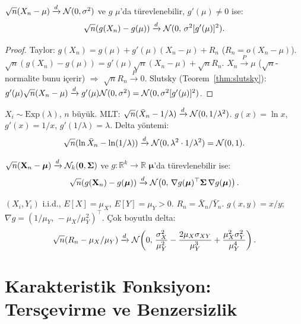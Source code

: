\begin{teorem}
\label{thm:delta_yontemi}
$\sqrt{n}(X_n - \mu) \xrightarrow{d} \mathcal{N}(0, \sigma^2)$ ve $g$ $\mu$'da türevlenebilir,
$g'(\mu) \neq 0$ ise:
\[
  \sqrt{n}(g(X_n) - g(\mu)) \xrightarrow{d} \mathcal{N}(0,\, \sigma^2 [g'(\mu)]^2).
\]
\end{teorem}

\begin{proof}
Taylor: $g(X_n) = g(\mu) + g'(\mu)(X_n-\mu) + R_n$ ($R_n = o(X_n-\mu)$).
$\sqrt{n}(g(X_n)-g(\mu)) = g'(\mu)\sqrt{n}(X_n-\mu) + \sqrt{n}R_n$.
$X_n \xrightarrow{P} \mu$ ($\sqrt{n}$-normalite bunu içerir) $\Rightarrow$ $\sqrt{n}R_n \xrightarrow{P} 0$.
Slutsky (Teorem~\ref{thm:slutsky}): $g'(\mu)\sqrt{n}(X_n-\mu) \xrightarrow{d} g'(\mu)\mathcal{N}(0,\sigma^2)
= \mathcal{N}(0, \sigma^2[g'(\mu)]^2)$.
\end{proof}

\begin{ornek}
$X_i \sim \mathrm{Exp}(\lambda)$, $n$ büyük. MLT: $\sqrt{n}(\bar{X}_n - 1/\lambda) \xrightarrow{d} \mathcal{N}(0, 1/\lambda^2)$.
$g(x) = \ln x$, $g'(x) = 1/x$, $g'(1/\lambda) = \lambda$.
Delta yöntemi:
\[
  \sqrt{n}(\ln\bar{X}_n - \ln(1/\lambda)) \xrightarrow{d} \mathcal{N}(0, \lambda^2 \cdot 1/\lambda^2) = \mathcal{N}(0,1).
\]
\end{ornek}

\begin{teorem}
\label{thm:delta_cok}
$\sqrt{n}(\mathbf{X}_n - \boldsymbol{\mu}) \xrightarrow{d} \mathcal{N}_k(\mathbf{0}, \boldsymbol{\Sigma})$
ve $g : \mathbb{R}^k \to \mathbb{R}$ $\boldsymbol{\mu}$'da türevlenebilir ise:
\[
  \sqrt{n}(g(\mathbf{X}_n) - g(\boldsymbol{\mu})) \xrightarrow{d}
  \mathcal{N}\!\left(0,\, \nabla g(\boldsymbol{\mu})^\top \boldsymbol{\Sigma}\, \nabla g(\boldsymbol{\mu})\right).
\]
\end{teorem}

\begin{ornek}
$(X_i, Y_i)$ i.i.d., $E[X] = \mu_X$, $E[Y] = \mu_Y > 0$. $R_n = \bar{X}_n/\bar{Y}_n$.
$g(x,y) = x/y$; $\nabla g = (1/\mu_Y,\, -\mu_X/\mu_Y^2)^\top$.
Çok boyutlu delta:
\[
  \sqrt{n}(R_n - \mu_X/\mu_Y) \xrightarrow{d} \mathcal{N}\!\left(0,\,
  \frac{\sigma_X^2}{\mu_Y^2} - \frac{2\mu_X\sigma_{XY}}{\mu_Y^3} + \frac{\mu_X^2\sigma_Y^2}{\mu_Y^4}
  \right).
\]
\end{ornek}

\section{Karakteristik Fonksiyon: Tersçevirme ve Benzersizlik}
\label{sec:kf_ters}

